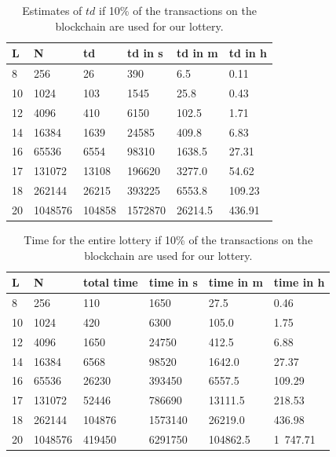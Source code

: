 \begin{table}[h]
\centering
\caption{Estimates of $td$ if 10\% of the transactions on the blockchain are used for our lottery.}
\label{tab:td-10percent-transactions}
\begin{tabular}{|l|l|l|l|l|l|}
\hline

L & N & td & td in s & td in m & td in h \\ \hline
8 & 256 & 26 & 390 & 6.5 & 0.11 \\ \hline
10 & 1024 & 103 & 1545 & 25.8 & 0.43 \\ \hline
12 & 4096 & 410 & 6150 & 102.5 & 1.71 \\ \hline
14 & 16384 & 1639 & 24585 & 409.8 & 6.83 \\ \hline
16 & 65536 & 6554 & 98310 & 1638.5 & 27.31 \\ \hline
17 & 131072 & 13108 & 196620 & 3277.0 & 54.62 \\ \hline
18 & 262144 & 26215 & 393225 & 6553.8 & 109.23 \\ \hline
20 & 1048576 & 104858 & 1572870 & 26214.5 & 436.91 \\ \hline


\end{tabular}
\end{table}

\begin{table}[h]
\centering
\caption{Time for the entire lottery if 10\% of the transactions on the blockchain are used for our lottery.}
\label{tab:total-time-10percent-transactions}
\begin{tabular}{|l|l|l|l|l|l|}
\hline

L & N & total time & time in s & time in m & time in h \\ \hline
8 & 256 & 110 & 1650 & 27.5 & 0.46 \\ \hline
10 & 1024 & 420 & 6300 & 105.0 & 1.75 \\ \hline
12 & 4096 & 1650 & 24750 & 412.5 & 6.88 \\ \hline
14 & 16384 & 6568 & 98520 & 1642.0 & 27.37 \\ \hline
16 & 65536 & 26230 & 393450 & 6557.5 & 109.29 \\ \hline
17 & 131072 & 52446 & 786690 & 13111.5 & 218.53 \\ \hline
18 & 262144 & 104876 & 1573140 & 26219.0 & 436.98 \\ \hline
20 & 1048576 & 419450 & 6291750 & 104862.5 & 1 747.71 \\ \hline

\end{tabular}
\end{table}


